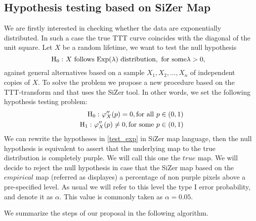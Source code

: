 \documentclass[preprint,12pt]{elsarticle}
\begin{document}
\subsection{Hypothesis testing based on SiZer Map}
\noindent We are firstly interested in checking whether the data are exponentially distributed. In such a case the true TTT curve coincides with the diagonal of the unit square. Let $X$ be a random lifetime, we want to test the null hypothesis 
\[
{\rm H_0 :} \ X \ {\rm follows \ Exp}(\lambda) \ {\rm distribution,\ for \ some} \lambda >0,
\]
against general alternatives based on a sample $X_1, X_2,\ldots, X_n$ of independent copies of $X$.
To solve the problem we propose a new procedure based on the TTT-transform and that uses the SiZer tool. In other words, we set the following hypothesis testing problem:
\begin{eqnarray} \label{test_exp}
\nonumber &&{\rm H_0 :} \ \varphi_X''(p)= 0, {\rm for \ all \ } p \in (0,1) \\
&&{\rm H_1 :} \ \varphi_X''(p)\neq 0, {\rm for \ some \ }  p \in (0,1)
\end{eqnarray}
We can rewrite the hypotheses in \eqref{test_exp} in SiZer map language, then the null hypothesis is equivalent to assert that the underlying map to the true distribution is completely purple. We will call this one the $true$ map. We will decide to reject the null hypothesis in case that the SiZer map based on the $empirical$ map (referred as  displayes) a percentage of non purple pixels above a pre-specified level. As usual we will refer to this level the type I error probability, and denote it as $\alpha$. This value is commonly taken as $\alpha=0.05$. 

We summarize the steps of our proposal in the following algorithm.
\end{document}
